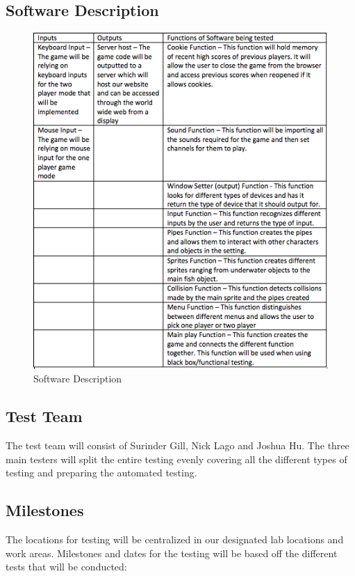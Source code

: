 \documentclass[11pt, oneside]{article}   	%
\begin{document}
\subsection{Software Description}
\begin{figure}[H] %
   \centering
   \includegraphics[width=5in]{Table2_SoftwareDescription.png} 
   \caption{Software Description}
   \label{}
\end{figure}%

\subsection{Test Team}
The test team will consist of Surinder Gill, Nick Lago and Joshua Hu. The three main testers will split the entire testing evenly covering all the different types of testing and preparing the automated testing. 

\subsection{Milestones}
The locations for testing will be centralized in our designated lab locations and work areas. 
Milestones and dates for the testing will be based off the different tests that will be conducted: 
 
\end{document}
